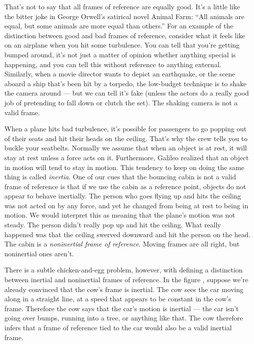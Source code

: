 That's not to say that all frames of reference are equally good. It's a little like the bitter joke
in George Orwell's satirical novel Animal Farm: ``All animals are equal, but some animals are more equal than others.''
For an example of the distinction between good and bad frames of reference, consider what it feels like on
an airplane when you hit some turbulence. You can tell that you're getting bumped around, it's not just
a matter of opinion whether anything special is happening, and you can tell this without reference to anything
external. Similarly, when a movie director wants to depict an earthquake, or the scene aboard a ship that's
been hit by a torpedo, the low-budget technique is to shake the camera around --- but we can tell it's fake
(unless the actors do a really good job of pretending to fall down or clutch the set). The shaking camera is
not a valid frame.

When a plane hits bad turbulence, it's possible for passengers to go popping out of their seats and hit their
heads on the ceiling. That's why the crew tells you to buckle your seatbelts. Normally we assume that when an
object is at rest, it will stay at rest unless a force acts on it. Furthermore, Galileo realized that
an object in motion will tend
to stay in motion. This tendency to keep on doing the same thing is called \emph{inertia}.
One of our cues that the bouncing cabin is not a valid frame of reference is that if we use the cabin as a
reference point, objects do not appear to behave inertially. The person who goes flying up and hits the ceiling
was not acted on by any force, and yet he changed from being at rest to being in motion. We would interpret this
as meaning that the plane's motion was not steady. The person didn't really pop up and hit the ceiling. What really
happened was that the ceiling swerved downward and hit the person on the head. The cabin is a \emph{noninertial frame
of reference}. Moving frames are all right, but noninertial ones aren't.

There is a subtle chicken-and-egg problem, however, with defining a distinction between inertial and noninertial
frames of reference. In the figure , suppose we're already convinced that the cow's
frame is inertial. The cow sees the car moving along in a straight line, at a speed that appears to be constant
in the cow's frame. Therefore the cow says that the car's motion is inertial --- the car isn't going over bumps,
running into a tree, or anything like that. The cow therefore infers that a frame of reference tied to the car
would also be a valid inertial frame.

